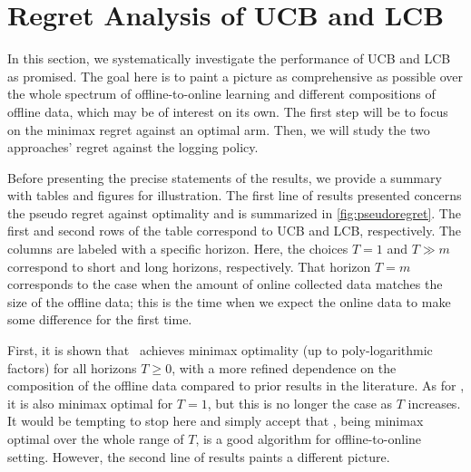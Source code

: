 \section{Regret Analysis of UCB and LCB}\label{sec:intersetanalysis}

In this section, we systematically investigate the performance of UCB and LCB as promised. The goal here is to paint a picture as comprehensive as possible over the whole spectrum of offline-to-online learning and different compositions of offline data, which may be of interest on its own. The first step will be to focus on the minimax regret against an optimal arm. Then, we will study the two approaches'  regret against the logging policy. 
 

Before presenting the precise statements of the results, we provide a summary with tables and figures for illustration. The first line of results presented concerns the pseudo regret against optimality and is summarized in \cref{fig:pseudoregret}. 
The first and second rows of the table correspond to UCB and LCB, respectively. The columns are labeled with a specific horizon. Here, the choices $T=1$ and $T\gg m$ correspond to short and long horizons, respectively. That horizon $T=m$ corresponds to the case when the amount of online collected data matches the size of the offline data; this is the time when we expect the online data to make some difference for the first time. 


First, it is shown that \algucb\ achieves minimax optimality (up to poly-logarithmic factors) for all horizons $T\geq 0$, with a more refined dependence on the composition of the offline data compared to prior results in the literature. As for \alglcb, it is also minimax optimal for $T=1$, but this is no longer the case as $T$ increases. It would be tempting to stop here and simply accept that \algucb, being minimax optimal over the whole range of $T$, is a good algorithm for offline-to-online setting. However, the second line of results paints a different picture.

